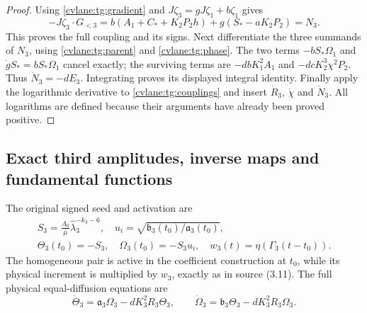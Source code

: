 \begin{proof}
Using \eqref{cvlane:tg:gradient} and
$J\zeta_3=gJ\zeta_1+b\zeta_1$ gives
\[
 -J\zeta_3\cdot G_{<3}
 =b(A_1+C_*+K_2P_2h)+g(S_*-aK_2P_2)=N_3.
\]
This proves the full coupling and its signs. Next differentiate the
three summands of $N_3$, using \eqref{cvlane:tg:parent} and
\eqref{cvlane:tg:phase}. The two terms
$-bS_*\Omega_1$ and $\dot gS_*=bS_*\Omega_1$ cancel exactly;
the surviving terms are $-dbK_1^2A_1$ and
$-dcK_2^3\chi^2P_2$. Thus $\dot N_3=-dE_3$.
Integrating proves its displayed integral identity. Finally apply
the logarithmic derivative to \eqref{cvlane:tg:couplings} and insert
$\dot R_3$, $\dot\chi$ and $\dot N_3$. All logarithms are defined
because their arguments have already been proved positive.
\end{proof}

\subsection{Exact third amplitudes, inverse maps and fundamental functions}

The original signed seed and activation are
\begin{equation}\label{cvlane:tg:seed}
\begin{gathered}
 S_3=\frac{A_0}{\mu}\widehat\lambda_3^{-k_3-6},\quad
 u_i=\sqrt{\mathfrak b_3(t_0)/\mathfrak a_3(t_0)},\\
 \Theta_3(t_0)=-S_3,\quad \Omega_3(t_0)=-S_3u_i,\quad
 w_3(t)=\eta(\Gamma_3(t-t_0)).
\end{gathered}
\end{equation}
The homogeneous pair is active in the coefficient construction at
$t_0$, while its physical increment is multiplied by $w_3$, exactly
as in source (3.11). The full physical equal-diffusion equations are
\begin{equation}\label{cvlane:tg:pair}
 \dot\Theta_3=\mathfrak a_3\Omega_3-dK_3^2R_3\Theta_3,
 \qquad
 \dot\Omega_3=\mathfrak b_3\Theta_3-dK_3^2R_3\Omega_3.
\end{equation}

